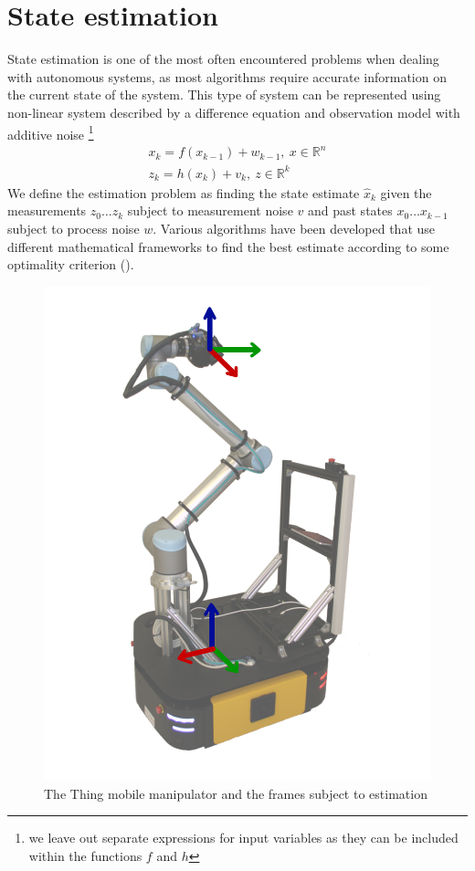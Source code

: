 \documentclass[times, utf8, diplomski, english]{fer}
\begin{document}
\chapter{State estimation}\label{chapter:State estimation}
State estimation is one of the most often encountered problems when dealing with autonomous systems, as most algorithms require accurate information on the current state of the system.
This type of system can be represented using non-linear system described by a difference equation and observation model with additive noise \footnote{we leave out separate expressions for input variables as they can be included within the functions $f$ and $h$}
\begin{subequations}\label{state_space_nl}
\begin{gather}
x_k = f\left(x_{k-1}\right) + w_{k-1} , \ x \in \mathbb{R}^n \\
z_k = h\left(x_k\right) + v_k, \ z \in \mathbb{R}^k
\end{gather}
\end{subequations}
We define the estimation problem as finding the state estimate $\hat{x}_k$ given the measurements $z_0 \dots z_k$ subject to measurement noise $v$ and past states $x_0 \dots x_{k-1}$ subject to process noise $w$.
Various algorithms have been developed that use different mathematical frameworks to find the best estimate according to some optimality criterion (\cite{thrun2005probabilistic}). %
\begin{figure}[h]
\centering
\includegraphics[scale=0.4]{Thingtr}
\caption{The Thing mobile manipulator and the frames subject to estimation}
\end{figure}
\end{document}
